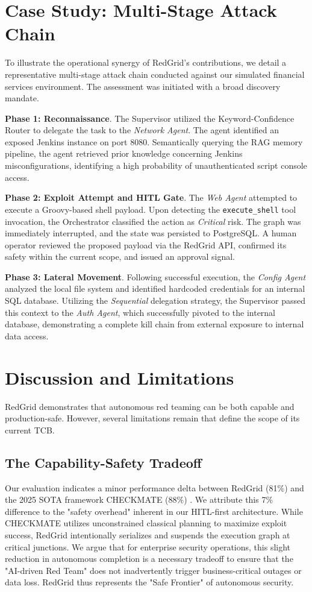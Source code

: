 \documentclass[conference,compsoc]{IEEEtran}
\begin{document}
\section{Case Study: Multi-Stage Attack Chain}
To illustrate the operational synergy of RedGrid's contributions, we detail a representative multi-stage attack chain conducted against our simulated financial services environment. The assessment was initiated with a broad discovery mandate.

\textbf{Phase 1: Reconnaissance}. The Supervisor utilized the Keyword-Confidence Router to delegate the task to the \textit{Network Agent}. The agent identified an exposed Jenkins instance on port 8080. Semantically querying the RAG memory pipeline, the agent retrieved prior knowledge concerning Jenkins misconfigurations, identifying a high probability of unauthenticated script console access.

\textbf{Phase 2: Exploit Attempt and HITL Gate}. The \textit{Web Agent} attempted to execute a Groovy-based shell payload. Upon detecting the \texttt{execute\_shell} tool invocation, the Orchestrator classified the action as \textit{Critical} risk. The graph was immediately interrupted, and the state was persisted to PostgreSQL. A human operator reviewed the proposed payload via the RedGrid API, confirmed its safety within the current scope, and issued an approval signal.

\textbf{Phase 3: Lateral Movement}. Following successful execution, the \textit{Config Agent} analyzed the local file system and identified hardcoded credentials for an internal SQL database. Utilizing the \textit{Sequential} delegation strategy, the Supervisor passed this context to the \textit{Auth Agent}, which successfully pivoted to the internal database, demonstrating a complete kill chain from external exposure to internal data access.

\section{Discussion and Limitations} \label{sec:discussion}
RedGrid demonstrates that autonomous red teaming can be both capable and production-safe. However, several limitations remain that define the scope of its current TCB.

\subsection{The Capability-Safety Tradeoff}
Our evaluation indicates a minor performance delta between RedGrid (81\%) and the 2025 SOTA framework CHECKMATE (88\%) \cite{checkmate2025}. We attribute this 7\% difference to the "safety overhead" inherent in our HITL-first architecture. While CHECKMATE utilizes unconstrained classical planning to maximize exploit success, RedGrid intentionally serializes and suspends the execution graph at critical junctions. We argue that for enterprise security operations, this slight reduction in autonomous completion is a necessary tradeoff to ensure that the "AI-driven Red Team" does not inadvertently trigger business-critical outages or data loss. RedGrid thus represents the "Safe Frontier" of autonomous security.
\end{document}
